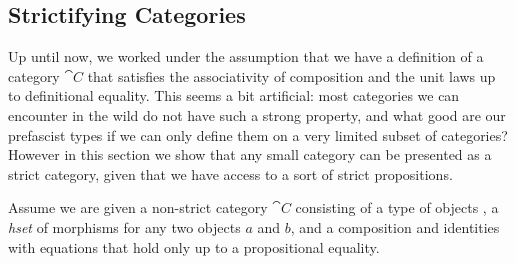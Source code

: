 \subsection{Strictifying Categories}\label{sec:cat-strictification}

Up until now, we worked under the assumption that we have a definition of
a category \( \cat{C} \) that satisfies the associativity of composition
and the unit laws up to definitional equality.
% 
This seems a bit artificial: most categories we can encounter in the wild 
do not have such a strong property, and what good are our prefascist types if
we can only define them on a very limited subset of categories?
% 
However in this section we show that any small category can be presented as
a strict category, given that we have access to a sort  of strict
propositions.

Assume we are given a non-strict category \( \cat{C} \) consisting of a type
of objects , a \emph{hset} of morphisms for any two objects \( a \) 
and \( b \), and a composition and identities with equations that hold only
up to a propositional equality.


